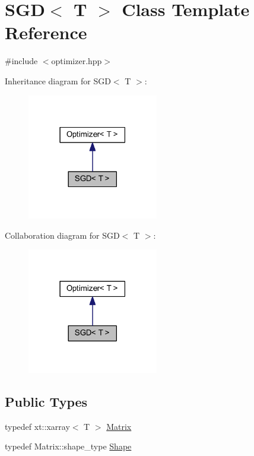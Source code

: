 \hypertarget{class_s_g_d}{}\section{S\+GD$<$ T $>$ Class Template Reference}
\label{class_s_g_d}


{\ttfamily \#include $<$optimizer.\+hpp$>$}



Inheritance diagram for S\+GD$<$ T $>$\+:
\nopagebreak
\begin{figure}[H]
\begin{center}
\leavevmode
\includegraphics[width=162pt]{class_s_g_d__inherit__graph}
\end{center}
\end{figure}


Collaboration diagram for S\+GD$<$ T $>$\+:
\nopagebreak
\begin{figure}[H]
\begin{center}
\leavevmode
\includegraphics[width=162pt]{class_s_g_d__coll__graph}
\end{center}
\end{figure}
\subsection*{Public Types}
\begin{DoxyCompactItemize}
\item 
typedef xt\+::xarray$<$ T $>$ \mbox{\hyperlink{class_s_g_d_a0c157dbad2dc900c00b9ca57f23ba676}{Matrix}}
\item 
typedef Matrix\+::shape\+\_\+type \mbox{\hyperlink{class_s_g_d_a3275687cc77c8557e2198c1feaed28a4}{Shape}}
\end{DoxyCompactItemize}
